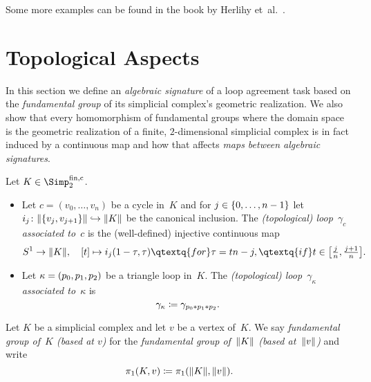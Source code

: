 Some more examples can be found in the book by
Herlihy et~al.~\cite[Sec.~5.6.3]{bookc:herlihyetal13}.

\section{Topological Aspects}
In this section we define an \emph{algebraic signature} of a loop agreement task
based on the \emph{fundamental group} of its simplicial complex's geometric
realization. We also show that every homomorphism of fundamental groups where
the domain space is the geometric realization of a finite, $2$-dimensional
simplicial complex is in fact induced by a continuous map and how that affects
\emph{maps between algebraic signatures}.

\begin{thDef}
    \label{ch3:def:assoctopoloop}
    Let $K\in\finSimp$.
    \begin{itemize}
        \item
            Let $c=(v_0,\dots,v_n)$ be a cycle in~$K$ and for
            $j\in\{0,\ldots,n-1\}$ let $i_j\colon\lVert\{v_j,v_{j+1}\}\rVert 
            \hookrightarrow\lVert K\rVert$ be the canonical inclusion.
            The \emph{(topological) loop~$\gamma_c$ associated to~$c$} is the
            (well-defined) injective continuous map
            \[
                S^1\to\geom K, \quad
                [t]\mapsto i_j(1-\tau,\tau) \qtextq{for} \tau=tn-j,
                    \qtextq{if} t\in\bigl[\tfrac{j}{n}, \tfrac{j+1}{n}\bigr]
            . \]
            
        \item
            Let $\kappa=(p_0,p_1,p_2)$ be a triangle loop in~$K$. The \emph{(topological)
            loop~$\gamma_\kappa$ associated to~$\kappa$} is
            \[ \gamma_\kappa \coloneqq \gamma_{p_0\ast p_1\ast p_2}  . \]
    \end{itemize}
\end{thDef}

\begin{thConvention}
    Let $K$ be a simplicial complex and let $v$ be a vertex of~$K$. We say
    \emph{fundamental group of~$K$ (based at $v$)} for the \emph{fundamental
    group of~$\lVert K\rVert$ (based at~$\lVert v\rVert$)} and write
    \[ \pi_1(K,v) \coloneqq \pi_1(\lVert K\rVert, \lVert v\rVert) . \]
\end{thConvention}

